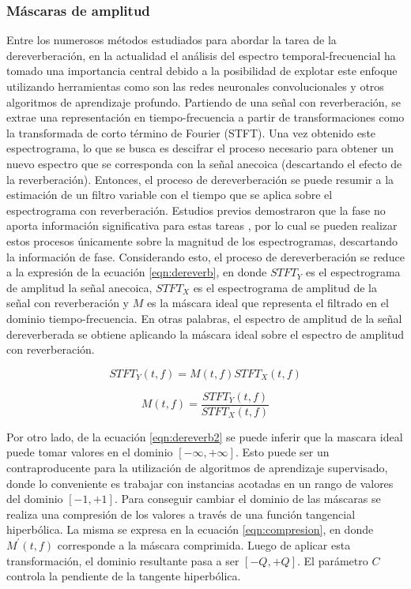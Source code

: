 \subsubsection{Máscaras de amplitud}

Entre los numerosos métodos estudiados para abordar la tarea de la dereverberación, en la actualidad el análisis del espectro temporal-frecuencial ha tomado una importancia central debido a la posibilidad de explotar este enfoque utilizando herramientas como son las redes neuronales convolucionales y otros algoritmos de aprendizaje profundo. Partiendo de una señal con reverberación, se extrae una representación en tiempo-frecuencia a partir de transformaciones como la transformada de corto término de Fourier (STFT). Una vez obtenido este espectrograma, lo que se busca es descifrar el proceso necesario para obtener un nuevo espectro que se corresponda con la señal anecoica (descartando el efecto de la reverberación). Entonces, el proceso de dereverberación se puede resumir a la estimación de un filtro variable con el tiempo que se aplica sobre el espectrograma con reverberación. Estudios previos demostraron que la fase no aporta información significativa para estas tareas \cite{fase1}\cite{fase2}, por lo cual se pueden realizar estos procesos únicamente sobre la magnitud de los espectrogramas, descartando la información de fase. Considerando esto, el proceso de dereverberación se reduce a la expresión de la ecuación \ref{eqn:dereverb}, en donde $STFT_{Y}$ es el espectrograma de amplitud la señal anecoica, $STFT_{X}$ es el espectrograma de amplitud de la señal con reverberación y $M$ es la máscara ideal que representa el filtrado en el dominio tiempo-frecuencia. En otras palabras, el espectro de amplitud de la señal dereverberada se obtiene aplicando la máscara ideal sobre el espectro de amplitud con reverberación. 
 
\begin{equation}
\label{eqn:dereverb}
	STFT_{Y}(t,f)= M(t,f) STFT_{X}(t,f) 
\end{equation}

\begin{equation}
\label{eqn:dereverb2}
	M(t,f) =  \frac{STFT_{Y}(t,f)}{STFT_{X}(t,f)} 
\end{equation}

Por otro lado, de la ecuación \ref{eqn:dereverb2} se puede inferir que la mascara ideal puede tomar valores en el dominio $[-\infty , +\infty]$. Esto puede ser un contraproducente para la utilización de algoritmos de aprendizaje supervisado, donde lo conveniente es trabajar con instancias acotadas en un rango de valores del dominio $[-1 , +1]$. Para conseguir cambiar el dominio de las máscaras se realiza una compresión de los valores a través de una función tangencial hiperbólica. La misma se expresa en la ecuación \ref{eqn:compresion}, en donde $M^{'}(t,f)$ corresponde a la máscara comprimida. Luego de aplicar esta transformación, el dominio resultante pasa a ser $[-Q , +Q]$. El parámetro $C$ controla la pendiente de la tangente hiperbólica. 

